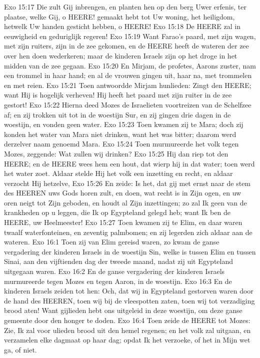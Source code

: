 Exo 15:17  Die zult Gij inbrengen, en planten hen op den berg Uwer erfenis, ter plaatse, welke Gij, o HEERE! gemaakt hebt tot Uw woning, het heiligdom, hetwelk Uw handen gesticht hebben, o HEERE!
Exo 15:18  De HEERE zal in eeuwigheid en geduriglijk regeren!
Exo 15:19  Want Farao's paard, met zijn wagen, met zijn ruiters, zijn in de zee gekomen, en de HEERE heeft de wateren der zee over hen doen wederkeren; maar de kinderen Israels zijn op het droge in het midden van de zee gegaan.
Exo 15:20  En Mirjam, de profetes, Aarons zuster, nam een trommel in haar hand; en al de vrouwen gingen uit, haar na, met trommelen en met reien.
Exo 15:21  Toen antwoordde Mirjam hunlieden: Zingt den HEERE; want Hij is hogelijk verheven! Hij heeft het paard met zijn ruiter in de zee gestort!
Exo 15:22  Hierna deed Mozes de Israelieten voortreizen van de Schelfzee af; en zij trokken uit tot in de woestijn Sur, en zij gingen drie dagen in de woestijn, en vonden geen water.
Exo 15:23  Toen kwamen zij te Mara; doch zij konden het water van Mara niet drinken, want het was bitter; daarom werd derzelver naam genoemd Mara.
Exo 15:24  Toen murmureerde het volk tegen Mozes, zeggende: Wat zullen wij drinken?
Exo 15:25  Hij dan riep tot den HEERE; en de HEERE wees hem een hout, dat wierp hij in dat water; toen werd het water zoet. Aldaar stelde Hij het volk een inzetting en recht, en aldaar verzocht Hij hetzelve,
Exo 15:26  En zeide: Is het, dat gij met ernst naar de stem des HEEREN uws Gods horen zult, en doen, wat recht is in Zijn ogen, en uw oren neigt tot Zijn geboden, en houdt al Zijn inzettingen; zo zal Ik geen van de krankheden op u leggen, die Ik op Egypteland gelegd heb; want Ik ben de HEERE, uw Heelmeester!
Exo 15:27  Toen kwamen zij te Elim, en daar waren twaalf waterfonteinen, en zeventig palmbomen; en zij legerden zich aldaar aan de wateren.
Exo 16:1  Toen zij van Elim gereisd waren, zo kwam de ganse vergadering der kinderen Israels in de woestijn Sin, welke is tussen Elim en tussen Sinai, aan den vijftienden dag der tweede maand, nadat zij uit Egypteland uitgegaan waren.
Exo 16:2  En de ganse vergadering der kinderen Israels murmureerde tegen Mozes en tegen Aaron, in de woestijn.
Exo 16:3  En de kinderen Israels zeiden tot hen: Och, dat wij in Egypteland gestorven waren door de hand des HEEREN, toen wij bij de vleespotten zaten, toen wij tot verzadiging brood aten! Want gijlieden hebt ons uitgeleid in deze woestijn, om deze ganse gemeente door den honger te doden.
Exo 16:4  Toen zeide de HEERE tot Mozes: Zie, Ik zal voor ulieden brood uit den hemel regenen; en het volk zal uitgaan, en verzamelen elke dagmaat op haar dag; opdat Ik het verzoeke, of het in Mijn wet ga, of niet.
